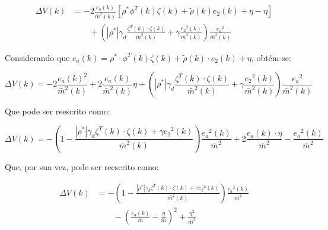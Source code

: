     \begin{equation*}
        \begin{split}
            \Delta V(k) &= -2 \frac{e_a(k)}{{\bar{m}}^2(k)} \left[ \rho^* \phi^T(k) \zeta(k)
                + \tilde{\rho}(k) e_2(k) + \eta - \eta \right] \\
                &\qquad {}+ \left( |\rho^*| \gamma_d \frac{\zeta^T(k) \cdot \zeta(k)}{{\bar{m}}^2(k)}
                + \gamma \frac{{e_2}^2(k)}{{\bar{m}}^2(k)} \right) \frac{{e_a}^2}{{\bar{m}}^2(k)}
        \end{split}
    \end{equation*}

    Considerando que $e_a(k) = \rho^* \cdot \phi^T(k) \zeta(k) + \tilde{\rho}(k) \cdot e_2(k) + \eta$, obtém-se:

    \begin{equation*}
        \Delta V(k) = -2 \frac{e_a(k)^2}{{\bar{m}}^2(k)} +2 \frac{e_a(k)}{{\bar{m}}^2(k)} \eta
            + \left( |\rho^*| \gamma_d \frac{\zeta^T(k) \cdot \zeta(k)}{{\bar{m}}^2(k)}
            + \gamma \frac{{e_2}^2(k)}{{\bar{m}}^2(k)} \right) \frac{{e_a}^2}{{\bar{m}}^2(k)}
    \end{equation*}

    Que pode ser reescrito como:

    \begin{equation*}
        \Delta V(k) = - \left( 1 - \frac{|\rho^*| \gamma_d \zeta^T(k) \cdot \zeta(k)
            + \gamma {e_2}^2(k)}{{\bar{m}}^2(k)} \right) \frac{{e_a}^2(k)}{{\bar{m}}^2}
            + 2 \frac{e_a(k) \cdot \eta}{{\bar{m}}^2} - \frac{{e_a}^2(k)}{{\bar{m}}^2}
    \end{equation*}

    Que, por sua vez, pode ser reescrito como:

    \begin{equation}
        \begin{split}
            \Delta V(k) &= - \left( 1 - \frac{|\rho^*| \gamma_d \zeta^T(k) \cdot \zeta(k)
            + \gamma {e_2}^2(k)}{{\bar{m}}^2(k)} \right) \frac{{e_a}^2(k)}{{\bar{m}}^2} \\
            &\qquad {}- {\left( \frac{e_a(k)}{\bar{m}} - \frac{\eta}{\bar{m}} \right)}^2 + \frac{\eta^2}{{\bar{m}}^2}
        \end{split}
    \end{equation}

